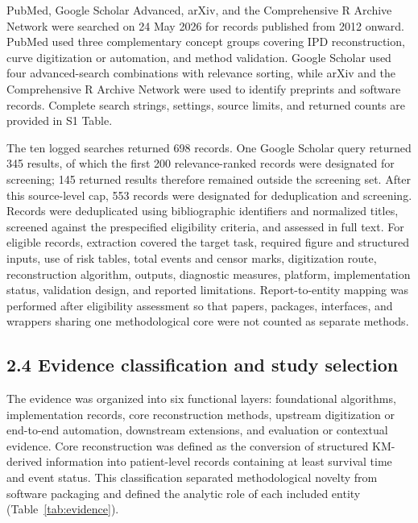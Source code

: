 \documentclass[10pt,letterpaper]{article}
\begin{document}
PubMed, Google Scholar Advanced, arXiv, and the Comprehensive R Archive Network were searched on 24 May 2026 for records published from 2012 onward. PubMed used three complementary concept groups covering IPD reconstruction, curve digitization or automation, and method validation. Google Scholar used four advanced-search combinations with relevance sorting, while arXiv and the Comprehensive R Archive Network were used to identify preprints and software records. Complete search strings, settings, source limits, and returned counts are provided in S1 Table.

The ten logged searches returned 698 records. One Google Scholar query returned 345 results, of which the first 200 relevance-ranked records were designated for screening; 145 returned results therefore remained outside the screening set. After this source-level cap, 553 records were designated for deduplication and screening. Records were deduplicated using bibliographic identifiers and normalized titles, screened against the prespecified eligibility criteria, and assessed in full text. For eligible records, extraction covered the target task, required figure and structured inputs, use of risk tables, total events and censor marks, digitization route, reconstruction algorithm, outputs, diagnostic measures, platform, implementation status, validation design, and reported limitations. Report-to-entity mapping was performed after eligibility assessment so that papers, packages, interfaces, and wrappers sharing one methodological core were not counted as separate methods.

\subsection*{2.4 Evidence classification and study selection}

The evidence was organized into six functional layers: foundational algorithms, implementation records, core reconstruction methods, upstream digitization or end-to-end automation, downstream extensions, and evaluation or contextual evidence. Core reconstruction was defined as the conversion of structured KM-derived information into patient-level records containing at least survival time and event status. This classification separated methodological novelty from software packaging and defined the analytic role of each included entity (Table~\ref{tab:evidence}).
\end{document}
